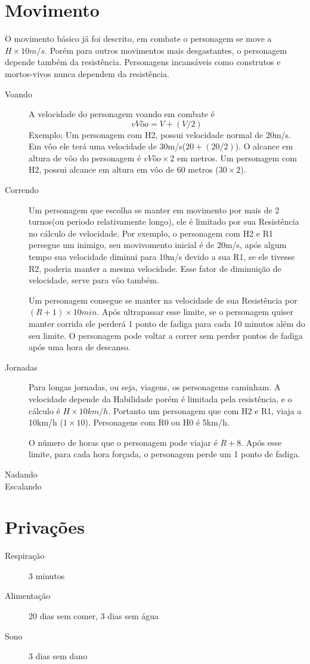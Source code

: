 \section{Movimento}
O movimento básico já foi descrito, em combate o personagem se move a \( H \times 10m/s \). Porém para outros movimentos mais desgastantes, o personagem depende também da resistência. Personagens incansáveis como construtos e mortos-vivos nunca dependem da resistência.
\begin{description}
\item[Voando] A velocidade do personagem voando em combate é 
\[ vVôo = V + (V/2) \]
Exemplo: Um personagem com H2, possui velocidade normal de 20m/s. Em vôo ele terá uma velocidade de 30m/s(\( 20 + (20/2) \)).
O alcance em altura de vôo do personagem é \( vVôo \times 2 \) em metros. Um personagem com H2, possui alcance em altura em vôo de 60 metros (\( 30 \times 2 \)).
\item[Correndo]
Um personagem que escolha se manter em movimento por mais de 2 turnos(ou periodo relativamente longo), ele é limitado por sua Resistência no cálculo de velocidade. Por exemplo, o personagem com H2 e R1 persegue um inimigo, seu movivomento inicial é de 20m/s, após algum tempo sua velocidade diminui para 10m/s devido a sua R1, se ele tivesse R2, poderia manter a mesma velocidade. Esse fator de diminuição de velocidade, serve para vôo também.

Um personagem consegue se manter na velocidade de sua Resistência por \( (R+1) \times 10min \). Após ultrapassar esse limite, se o personagem quiser manter corrida ele perderá 1 ponto de fadiga para cada 10 minutos além do seu limite. O personagem pode voltar a correr sem perder pontos de fadiga após uma hora de descanso.

\item[Jornadas] Para longas jornadas, ou seja, viagens, os personagems caminham. A velocidade depende da Habilidade porém é limitada pela resistência, e o cálculo é \( H \times 10km/h \). Portanto um personagem que com H2 e R1, viaja a 10km/h (\( 1 \times 10 \)). Personagens com R0 ou H0 é 5km/h.

O número de horas que o personagem pode viajar é \( R + 8 \). Após esse limite, para cada hora forçada, o personagem perde um 1 ponto de fadiga. 

\item[Nadando]
\item[Escalando]
\end{description}

\section{Privações}
\begin{description}
\item[Respiração] 3 minutos
\item[Alimentação] 20 dias sem comer, 3 dias sem água
\item[Sono] 3 dias sem dano
\end{description}
